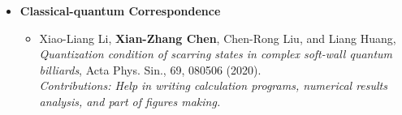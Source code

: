 \documentclass[letterpaper,10.8pt]{article}
\newcommand{\resumeItem}[2]{
  \item\small{
    \textbf{#1}{: #2 \vspace{-2pt}}
  }
}
\newcommand{\resumeItemListStart}{\begin{itemize}}
\newcommand{\resumeItemListEnd}{\end{itemize}\vspace{-5pt}}
\begin{document}
\begin{itemize}[font=$\bullet$]
    \item[]{\textbf{Classical-quantum Correspondence}
    \begin{itemize}
        \item {Xiao-Liang Li, \textbf{Xian-Zhang Chen}, Chen-Rong Liu, and Liang Huang, \textit{Quantization condition of scarring states in complex soft-wall quantum billiards},  Acta Phys. Sin., 69, 080506 (2020).\\
        \textit{Contributions: Help in writing calculation programs, numerical results analysis, and part of figures making.}
        }
    \end{itemize}}
    
\end{itemize}
      
\end{document}
